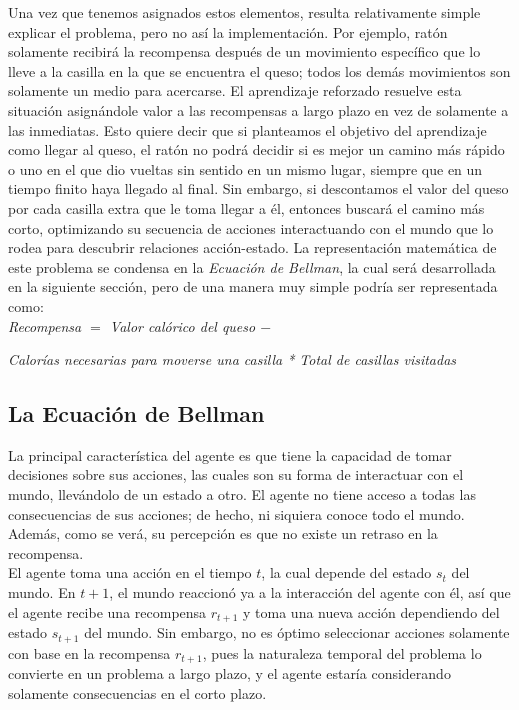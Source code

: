 Una vez que tenemos asignados estos elementos, resulta relativamente simple explicar el problema, pero no as\'i la implementaci\'on. Por ejemplo, rat\'on solamente recibir\'a la recompensa despu\'es de un movimiento espec\'ifico que lo lleve a la casilla en la que se encuentra el queso; todos los dem\'as movimientos son solamente un medio para acercarse. El aprendizaje reforzado resuelve esta situaci\'on asign\'andole valor a las recompensas a largo plazo en vez de solamente a las inmediatas. Esto quiere decir que si planteamos el objetivo del aprendizaje como llegar al queso, el rat\'on no podr\'a decidir si es mejor un camino m\'as r\'apido o uno en el que dio vueltas sin sentido en un mismo lugar, siempre que en un tiempo finito haya llegado al final. Sin embargo, si descontamos el valor del queso por cada casilla extra que le toma llegar a \'el, entonces buscar\'a el camino m\'as corto, optimizando su secuencia de acciones interactuando con el mundo que lo rodea para descubrir relaciones acci\'on-estado. La representaci\'on matem\'atica de este problema se condensa en la \textit{Ecuaci\'on de Bellman}, la cual ser\'a desarrollada en la siguiente secci\'on, pero de una manera muy simple podr\'ia ser representada como:\\

\textit{Recompensa $=$ Valor cal\'orico del queso $-$}

\hspace{22mm} \textit{Calor\'ias necesarias para moverse una casilla * Total de casillas visitadas}
  
\subsection{La Ecuaci\'on de Bellman}  
    
La principal caracter\'istica del agente es que tiene la capacidad de tomar decisiones sobre sus acciones, las cuales son su forma de interactuar con el mundo, llev\'andolo de un estado a otro. El agente no tiene acceso a todas las consecuencias de sus acciones; de hecho, ni siquiera conoce todo el mundo. Adem\'as, como se ver\'a, su percepci\'on es que no existe un retraso en la recompensa.\\

El agente toma una acci\'on en el tiempo $t$, la cual depende del estado $s_t$ del mundo. En $t+1$, el mundo reaccion\'o ya a la interacci\'on del agente con \'el, as\'i que el agente recibe una recompensa $r_{t+1}$ y toma una nueva acci\'on dependiendo del estado $s_{t+1}$ del mundo. Sin embargo, no es \'optimo seleccionar acciones solamente con base en la recompensa $r_{t+1}$, pues la naturaleza temporal del problema lo convierte en un problema a largo plazo, y el agente estar\'ia considerando solamente consecuencias en el corto plazo.\\

